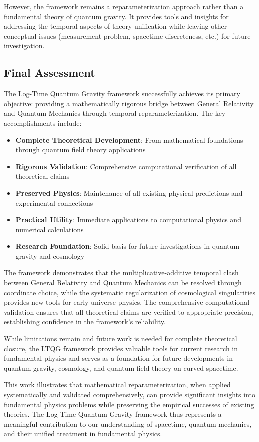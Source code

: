 However, the framework remains a reparameterization approach rather than a fundamental theory of quantum gravity. It provides tools and insights for addressing the temporal aspects of theory unification while leaving other conceptual issues (measurement problem, spacetime discreteness, etc.) for future investigation.

\subsection{Final Assessment}
\label{subsec:final_assessment}

The Log-Time Quantum Gravity framework successfully achieves its primary objective: providing a mathematically rigorous bridge between General Relativity and Quantum Mechanics through temporal reparameterization. The key accomplishments include:

\begin{itemize}
\item \textbf{Complete Theoretical Development}: From mathematical foundations through quantum field theory applications
\item \textbf{Rigorous Validation}: Comprehensive computational verification of all theoretical claims
\item \textbf{Preserved Physics}: Maintenance of all existing physical predictions and experimental connections
\item \textbf{Practical Utility}: Immediate applications to computational physics and numerical calculations
\item \textbf{Research Foundation}: Solid basis for future investigations in quantum gravity and cosmology
\end{itemize}

The framework demonstrates that the multiplicative-additive temporal clash between General Relativity and Quantum Mechanics can be resolved through coordinate choice, while the systematic regularization of cosmological singularities provides new tools for early universe physics. The comprehensive computational validation ensures that all theoretical claims are verified to appropriate precision, establishing confidence in the framework's reliability.

While limitations remain and future work is needed for complete theoretical closure, the LTQG framework provides valuable tools for current research in fundamental physics and serves as a foundation for future developments in quantum gravity, cosmology, and quantum field theory on curved spacetime.

This work illustrates that mathematical reparameterization, when applied systematically and validated comprehensively, can provide significant insights into fundamental physics problems while preserving the empirical successes of existing theories. The Log-Time Quantum Gravity framework thus represents a meaningful contribution to our understanding of spacetime, quantum mechanics, and their unified treatment in fundamental physics.
